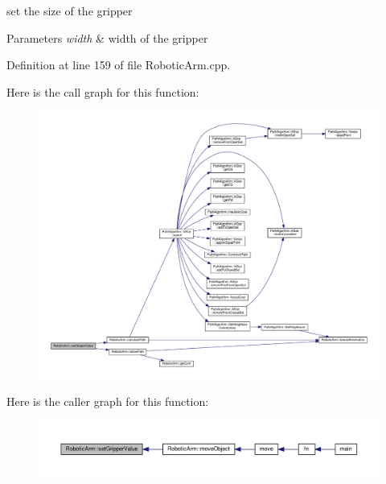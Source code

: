 set the size of the gripper 


\begin{DoxyParams}{Parameters}
{\em width} & width of the gripper \\
\hline
\end{DoxyParams}


Definition at line 159 of file Robotic\+Arm.\+cpp.



Here is the call graph for this function\+:
\nopagebreak
\begin{figure}[H]
\begin{center}
\leavevmode
\includegraphics[width=350pt]{class_robotic_arm_a5b15b0eb40028d3524bae3a52552bd85_cgraph}
\end{center}
\end{figure}




Here is the caller graph for this function\+:\nopagebreak
\begin{figure}[H]
\begin{center}
\leavevmode
\includegraphics[width=350pt]{class_robotic_arm_a5b15b0eb40028d3524bae3a52552bd85_icgraph}
\end{center}
\end{figure}


